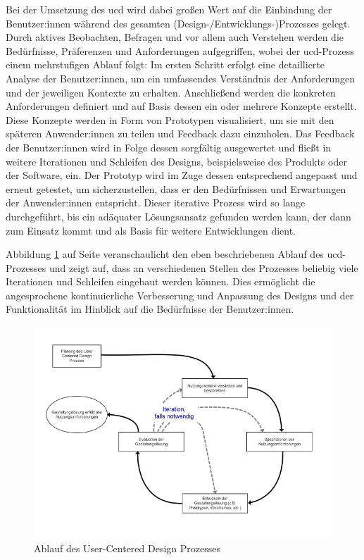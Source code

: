 \documentclass[a4paper,12pt,twoside,numbers=noendperiod]{scrreprt}
\begin{document}
Bei der Umsetzung des \ac{ucd} wird dabei großen Wert auf die Einbindung der Benutzer:innen während des gesamten (Design-/Entwicklungs-)Prozesses gelegt. Durch aktives Beobachten, Befragen und vor allem auch Verstehen werden die Bedürfnisse, Präferenzen und Anforderungen aufgegriffen, wobei der \ac{ucd}-Prozess einem mehrstufigen Ablauf folgt: Im ersten Schritt erfolgt eine detaillierte Analyse der Benutzer:innen, um ein umfassendes Verständnis der Anforderungen und der jeweiligen Kontexte zu erhalten. Anschließend werden die konkreten Anforderungen definiert und auf Basis dessen ein oder mehrere Konzepte erstellt. Diese Konzepte werden in Form von Prototypen visualisiert, um sie mit den späteren Anwender:innen zu teilen und Feedback dazu einzuholen. Das Feedback der Benutzer:innen wird in Folge dessen sorgfältig ausgewertet und fließt in weitere Iterationen und Schleifen des Designs, beispielsweise des Produkts oder der Software, ein. Der Prototyp wird im Zuge dessen entsprechend angepasst und erneut getestet, um sicherzustellen, dass er den Bedürfnissen und Erwartungen der Anwender:innen entspricht. Dieser iterative Prozess wird so lange durchgeführt, bis ein adäquater Lösungsansatz gefunden werden kann, der dann zum Einsatz kommt und als Basis für weitere Entwicklungen dient. \cite{frieling_user_2019, ionos_se_user-centered_2022}

\medskip

Abbildung \ref{fig:ucd-prozess-ablauf} auf Seite \pageref{fig:ucd-prozess-ablauf} veranschaulicht den eben beschriebenen Ablauf des \ac{ucd}-Prozesses und zeigt auf, dass an verschiedenen Stellen des Prozesses beliebig viele Iterationen und Schleifen eingebaut werden können. Dies ermöglicht die angesprochene kontinuierliche Verbesserung und Anpassung des Designs und der Funktionalität im Hinblick auf die Bedürfnisse der Benutzer:innen.

\begin{figure}[ht!]
    \centering
    \includegraphics[width=.85\linewidth]{thesis/images/Frieling_UCD-Prozess.pdf}
    \caption[Ablauf des User-Centered Design Prozesses]{Ablauf des User-Centered Design Prozesses \cite{frieling_user_2019}}
    \label{fig:ucd-prozess-ablauf}
\end{figure}
\end{document}
